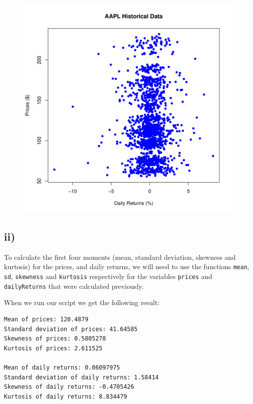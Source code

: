 \documentclass[11pt, letterpaper]{article}
\begin{document}
\begin{file}[q6.r i)]
	
\end{file}

\begin{figure}[h!]
	\centering
	\includegraphics[scale=0.55]{code/q6-1.png}
\end{figure}

\subsection*{ii)}
To calculate the first four moments (mean, standard deviation, skewness and
kurtosis) for the prices,
and daily returns, we will need to use the functions \verb|mean|, \verb|sd|,
\verb|skewness| and \verb|kurtosis|
respectively for the variables \verb|prices| and \verb|dailyReturns| that were
calculated previously.

\begin{file}[q6.r ii)]
	
\end{file}

\noindent When we run our script we get the following result:

\begin{verbatim}
Mean of prices: 120.4879 
Standard deviation of prices: 41.64585 
Skewness of prices: 0.5805278 
Kurtosis of prices: 2.611525 

Mean of daily returns: 0.06097975 
Standard deviation of daily returns: 1.58414 
Skewness of daily returns: -0.4705426 
Kurtosis of daily returns: 8.834479 
\end{verbatim}
\end{document}
